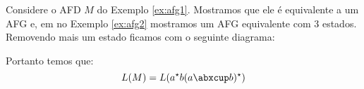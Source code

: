 \begin{example}
  Considere o AFD $M$ do Exemplo \ref{ex:afg1}.
Mostramos que ele é equivalente a um AFG e, em no Exemplo \ref{ex:afg2} mostramos um AFG equivalente com 3 estados.
Removendo mais um estado ficamos com o seguinte diagrama:

\begin{center}
\end{center}

Portanto temos que:
\begin{displaymath}
  L(M) = L(a^\star b(a \abxcup b)^\star)
\end{displaymath}
\end{example}

